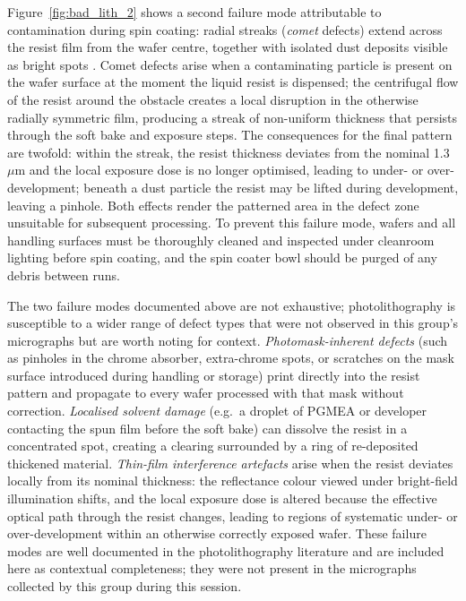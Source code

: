 Figure~\ref{fig:bad_lith_2} shows a second failure mode attributable to
contamination during spin coating: radial streaks (\emph{comet} defects) extend
across the resist film from the wafer centre, together with isolated
dust deposits
visible as bright spots \cite{FundTechProc2024}. Comet defects arise when a
contaminating particle is present on the wafer surface at the moment the liquid
resist is dispensed; the centrifugal flow of the resist around the
obstacle creates
a local disruption in the otherwise radially symmetric film,
producing a streak of
non-uniform thickness that persists through the soft bake and
exposure steps. The
consequences for the final pattern are twofold: within the streak, the resist
thickness deviates from the nominal 1.3\,$\mu$m and the local
exposure dose is no
longer optimised, leading to under- or over-development; beneath a
dust particle the
resist may be lifted during development, leaving a pinhole. Both effects render
the patterned area in the defect zone unsuitable for subsequent processing. To
prevent this failure mode, wafers and all handling surfaces must be thoroughly
cleaned and inspected under cleanroom lighting before spin coating, and the spin
coater bowl should be purged of any debris between runs.

The two failure modes documented above are not exhaustive;
photolithography is susceptible to a wider range of defect types that
were not observed in this group's micrographs but are worth noting
for context. \textit{Photomask-inherent defects} (such as pinholes in
  the chrome absorber, extra-chrome spots, or scratches on the mask
surface introduced during handling or storage) print directly into
the resist pattern and propagate to every wafer processed with that
mask without correction. \textit{Localised solvent damage} (e.g.\ a
  droplet of PGMEA or developer contacting the spun film before the
soft bake) can dissolve the resist in a concentrated spot, creating a
clearing surrounded by a ring of re-deposited thickened material.
\textit{Thin-film interference artefacts} arise when the resist
deviates locally from its nominal thickness: the reflectance colour
viewed under bright-field illumination shifts, and the local exposure
dose is altered because the effective optical path through the resist
changes, leading to regions of systematic under- or over-development
within an otherwise correctly exposed wafer. These failure modes are
well documented in the photolithography literature
\cite{FundTechProc2024} and are included here as contextual
completeness; they were not present in the micrographs collected by
this group during this session.
